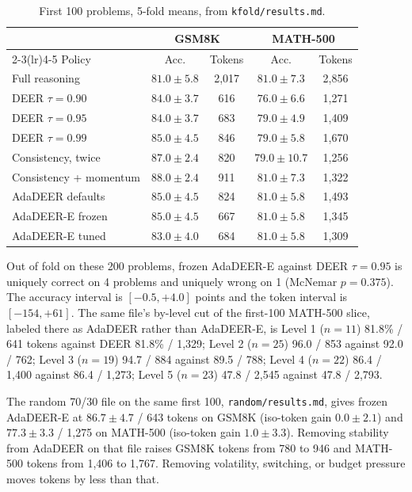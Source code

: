 \begin{table}[!t]
\caption{First 100 problems, 5-fold means, from \texttt{kfold/results.md}.}
\label{tab:k100}
\centering
\scriptsize
\begin{tabular}{@{}lcccc@{}}
\toprule
 & \multicolumn{2}{c}{GSM8K} & \multicolumn{2}{c}{MATH-500} \\
\cmidrule(lr){2-3}\cmidrule(lr){4-5}
Policy & Acc. & Tokens & Acc. & Tokens \\
\midrule
Full reasoning & $81.0\pm 5.8$ & 2{,}017 & $81.0\pm 7.3$ & 2{,}856 \\
DEER $\tau=0.90$ & $84.0\pm 3.7$ & 616 & $76.0\pm 6.6$ & 1{,}271 \\
DEER $\tau=0.95$ & $84.0\pm 3.7$ & 683 & $79.0\pm 4.9$ & 1{,}409 \\
DEER $\tau=0.99$ & $85.0\pm 4.5$ & 846 & $79.0\pm 5.8$ & 1{,}670 \\
Consistency, twice & $87.0\pm 2.4$ & 820 & $79.0\pm 10.7$ & 1{,}256 \\
Consistency + momentum & $88.0\pm 2.4$ & 911 & $81.0\pm 7.3$ & 1{,}322 \\
AdaDEER defaults & $85.0\pm 4.5$ & 824 & $81.0\pm 5.8$ & 1{,}493 \\
AdaDEER-E frozen & $85.0\pm 4.5$ & 667 & $81.0\pm 5.8$ & 1{,}345 \\
AdaDEER-E tuned & $83.0\pm 4.0$ & 684 & $81.0\pm 5.8$ & 1{,}309 \\
\bottomrule
\end{tabular}
\end{table}

Out of fold on these 200 problems, frozen AdaDEER-E against DEER $\tau=0.95$ is uniquely correct on 4 problems and uniquely wrong on 1 (McNemar $p=0.375$).
The accuracy interval is $[-0.5,+4.0]$ points and the token interval is $[-154,+61]$.
The same file's by-level cut of the first-100 MATH-500 slice, labeled there as AdaDEER rather than AdaDEER-E, is Level 1 ($n=11$) 81.8\% / 641 tokens against DEER 81.8\% / 1{,}329; Level 2 ($n=25$) 96.0 / 853 against 92.0 / 762; Level 3 ($n=19$) 94.7 / 884 against 89.5 / 788; Level 4 ($n=22$) 86.4 / 1{,}400 against 86.4 / 1{,}273; Level 5 ($n=23$) 47.8 / 2{,}545 against 47.8 / 2{,}793.

The random 70/30 file on the same first 100, \texttt{random/results.md}, gives frozen AdaDEER-E at $86.7\pm 4.7$ / 643 tokens on GSM8K (iso-token gain $0.0\pm 2.1$) and $77.3\pm 3.3$ / 1{,}275 on MATH-500 (iso-token gain $1.0\pm 3.3$).
Removing stability from AdaDEER on that file raises GSM8K tokens from 780 to 946 and MATH-500 tokens from 1{,}406 to 1{,}767.
Removing volatility, switching, or budget pressure moves tokens by less than that.

